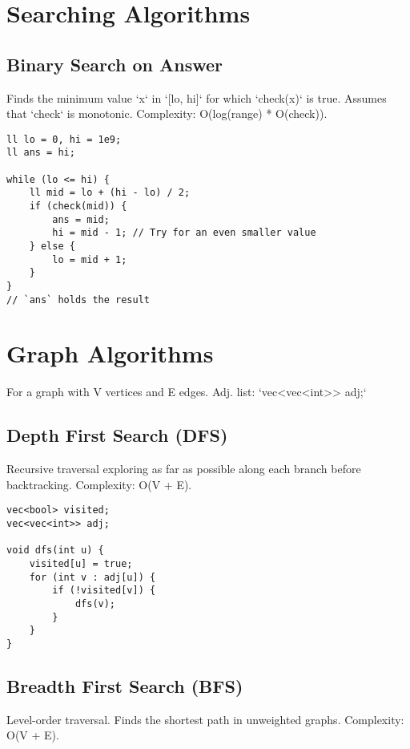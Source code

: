 \documentclass[10pt]{article}
\begin{document}
\begin{multicols}{2}
\section{Searching Algorithms}

\subsection{Binary Search on Answer}
Finds the minimum value `x` in `[lo, hi]` for which `check(x)` is true. Assumes that `check` is monotonic. Complexity: O(log(range) * O(check)).

\begin{lstlisting}
ll lo = 0, hi = 1e9;
ll ans = hi;

while (lo <= hi) {
    ll mid = lo + (hi - lo) / 2;
    if (check(mid)) {
        ans = mid;
        hi = mid - 1; // Try for an even smaller value
    } else {
        lo = mid + 1;
    }
}
// `ans` holds the result
\end{lstlisting}

\newpage
\section{Graph Algorithms}
For a graph with V vertices and E edges. Adj. list: `vec<vec<int>> adj;`

\subsection{Depth First Search (DFS)}
Recursive traversal exploring as far as possible along each branch before backtracking. Complexity: O(V + E).

\begin{lstlisting}
vec<bool> visited;
vec<vec<int>> adj;

void dfs(int u) {
    visited[u] = true;
    for (int v : adj[u]) {
        if (!visited[v]) {
            dfs(v);
        }
    }
}
\end{lstlisting}

\subsection{Breadth First Search (BFS)}
Level-order traversal. Finds the shortest path in unweighted graphs. Complexity: O(V + E).


\end{multicols}
\end{document}
